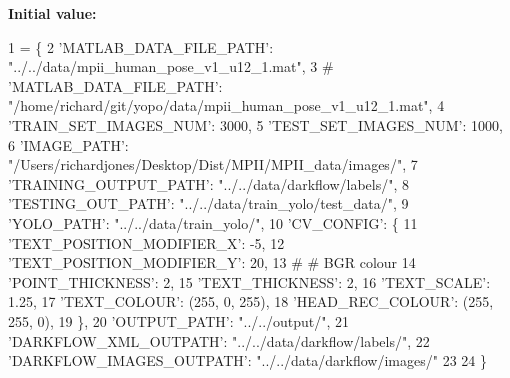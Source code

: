 {\bfseries Initial value\+:}
\begin{DoxyCode}
1 =  \{
2     \textcolor{stringliteral}{'MATLAB\_DATA\_FILE\_PATH'}: \textcolor{stringliteral}{"../../data/mpii\_human\_pose\_v1\_u12\_1.mat"},
3     \textcolor{comment}{# 'MATLAB\_DATA\_FILE\_PATH': "/home/richard/git/yopo/data/mpii\_human\_pose\_v1\_u12\_1.mat",}
4     \textcolor{stringliteral}{'TRAIN\_SET\_IMAGES\_NUM'}: 3000,
5     \textcolor{stringliteral}{'TEST\_SET\_IMAGES\_NUM'}: 1000,
6     \textcolor{stringliteral}{'IMAGE\_PATH'}: \textcolor{stringliteral}{"/Users/richardjones/Desktop/Dist/MPII/MPII\_data/images/"},
7     \textcolor{stringliteral}{'TRAINING\_OUTPUT\_PATH'}: \textcolor{stringliteral}{"../../data/darkflow/labels/"},
8     \textcolor{stringliteral}{'TESTING\_OUT\_PATH'}: \textcolor{stringliteral}{"../../data/train\_yolo/test\_data/"},
9     \textcolor{stringliteral}{'YOLO\_PATH'}: \textcolor{stringliteral}{"../../data/train\_yolo/"},
10     \textcolor{stringliteral}{'CV\_CONFIG'}: \{
11         \textcolor{stringliteral}{'TEXT\_POSITION\_MODIFIER\_X'}: -5,
12         \textcolor{stringliteral}{'TEXT\_POSITION\_MODIFIER\_Y'}: 20,
13         \textcolor{comment}{# # BGR colour}
14         \textcolor{stringliteral}{'POINT\_THICKNESS'}: 2,
15         \textcolor{stringliteral}{'TEXT\_THICKNESS'}: 2,
16         \textcolor{stringliteral}{'TEXT\_SCALE'}: 1.25,
17         \textcolor{stringliteral}{'TEXT\_COLOUR'}: (255, 0, 255),
18         \textcolor{stringliteral}{'HEAD\_REC\_COLOUR'}: (255, 255, 0),
19     \},
20     \textcolor{stringliteral}{'OUTPUT\_PATH'}: \textcolor{stringliteral}{"../../output/"},
21     \textcolor{stringliteral}{'DARKFLOW\_XML\_OUTPATH'}: \textcolor{stringliteral}{"../../data/darkflow/labels/"},
22     \textcolor{stringliteral}{'DARKFLOW\_IMAGES\_OUTPATH'}: \textcolor{stringliteral}{"../../data/darkflow/images/"}
23 
24 \}
\end{DoxyCode}
